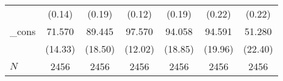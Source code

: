 {\begin{tabular}{l*{6}{c}}
            &                   (0.14)         &                   (0.19)         &                   (0.12)         &                   (0.19)         &                   (0.22)         &                   (0.22)         \\
\_cons      &                   71.570\sym{***}&                   89.445\sym{***}&                   97.570\sym{***}&                   94.058\sym{***}&                   94.591\sym{***}&                   51.280\sym{*}  \\
            &                  (14.33)         &                  (18.50)         &                  (12.02)         &                  (18.85)         &                  (19.96)         &                  (22.40)         \\
\hline
\(N\)       &                     2456         &                     2456         &                     2456         &                     2456         &                     2456         &                     2456         \\
\hline\hline
\end{tabular}
}
